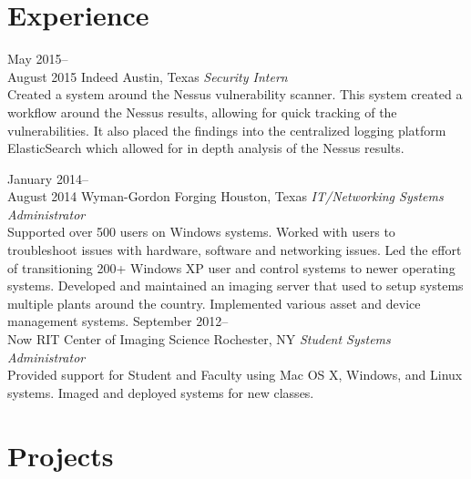 \documentclass[]{CalebCoffie-CV-Class} %
\begin{document}

\section{Experience}

\begin{entrylist}
\entry
{May 2015--\\August 2015}
{Indeed}
{Austin, Texas}
{\emph{Security Intern} \\
Created a system around the Nessus vulnerability scanner. This system created a workflow around the Nessus results, allowing for quick tracking of the vulnerabilities. It also placed the findings into the centralized logging platform ElasticSearch which allowed for in depth analysis of the Nessus results.}

\entry
{January 2014--\\August 2014}
{Wyman-Gordon Forging}
{Houston, Texas}
{\emph{IT/Networking Systems Administrator} \\
Supported over 500 users on Windows systems. Worked with users to troubleshoot issues with hardware, software and networking issues. Led the effort of transitioning 200+ Windows XP user and control systems to newer operating systems. Developed and maintained an imaging server that used to setup systems multiple plants around the country. Implemented various asset and device management systems.}
\entry
{September 2012--\\Now}
{RIT Center of Imaging Science}
{Rochester, NY}
{\emph{Student Systems Administrator} \\
Provided support for Student and Faculty using Mac OS X, Windows, and Linux systems. Imaged and deployed systems for new classes.}
\end{entrylist}


\section{Projects}
\end{document}
